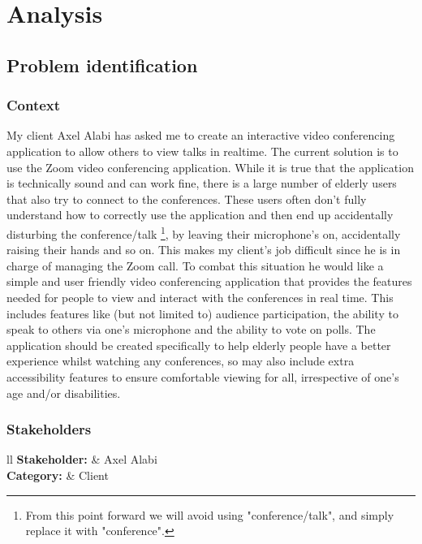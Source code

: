 \pagestyle{fancy}
\chead{\thepage}

\chapter{Analysis}

\section{Problem identification}

\subsection{Context}
\label{sec:context}

My client Axel Alabi has asked me to create an interactive
video conferencing application to allow others to view talks 
in realtime. The current solution is to use the Zoom 
video conferencing application. While it is true that the 
application is technically sound and can work fine, there is a
large number of elderly users that also try to connect to the 
conferences. These users often don't fully understand how to 
correctly use the application and then end up accidentally 
disturbing the conference/talk \footnote{From this point 
forward we will avoid using "conference/talk", and simply
replace it with "conference".}, by leaving their microphone's
on, accidentally raising their hands and so on. This makes my
client's job difficult since he is in charge of managing the 
Zoom call. To combat this situation he would like a 
simple and user friendly video conferencing application that
provides the features needed for people to view and interact
with the conferences in real time. This includes 
features like (but not limited to) audience participation,
the ability to speak to others via one's microphone and the
ability to vote on polls. The application should be
created specifically to help elderly people have a better 
experience whilst watching any conferences, so may also
include extra accessibility features to ensure comfortable
viewing for all, irrespective of one's age and/or disabilities.

\subsection{Stakeholders}

\begin{tblr}{ll}
  \textbf{Stakeholder: } & Axel Alabi\\
  \textbf{Category: } & Client\\
\end{tblr}
\vspace{0.2cm}

